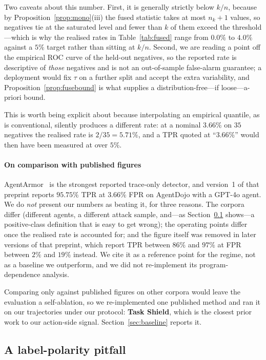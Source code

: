 \documentclass[preprint,12pt,number]{elsarticle}
\theoremstyle{definition}
\begin{document}
Two caveats about this number. First, it is generally strictly below $k/n$, because
by Proposition~\ref{prop:mono}(iii) the fused statistic takes at most $n_k+1$
values, so negatives tie at the saturated level and fewer than $k$ of them exceed
the threshold---which is why the realised rates in Table~\ref{tab:fused} range from
$0.0\%$ to $4.0\%$ against a $5\%$ target rather than sitting at $k/n$. Second, we
are reading a point off the empirical ROC curve of the held-out negatives, so the
reported rate is descriptive of \emph{those} negatives and is not an out-of-sample
false-alarm guarantee; a deployment would fix $\tau$ on a further split and accept
the extra variability, and Proposition~\ref{prop:fusebound} is what supplies a
distribution-free---if loose---a-priori bound.

This is worth being explicit about because interpolating an empirical quantile, as
is conventional, silently produces a different rate: at a nominal $3.66\%$ on $35$
negatives the realised rate is $2/35 = 5.71\%$, and a TPR quoted at ``$3.66\%$''
would then have been measured at over $5\%$.

\paragraph{On comparison with published figures}
AgentArmor~\citep{wang2025agentarmor} is the strongest reported trace-only
detector, and version~1 of that preprint reports $95.75\%$ TPR at $3.66\%$ FPR on
AgentDojo with a GPT-4o agent. We do \emph{not} present our numbers as beating it,
for three reasons. The corpora differ (different agents, a different attack
sample, and---as Section~\ref{sec:polarity} shows---a positive-class definition
that is easy to get wrong); the operating points differ once the realised rate is
accounted for; and the figure itself was removed in later versions of that
preprint, which report TPR between $86\%$ and $97\%$ at FPR between $2\%$ and
$19\%$ instead. We cite it as a reference point for the regime, not as a baseline
we outperform, and we did not re-implement its program-dependence analysis.

Comparing only against published figures on other corpora would leave the
evaluation a self-ablation, so we re-implemented one published method and ran it
on our trajectories under our protocol: \textbf{Task Shield}, which is the closest
prior work to our action-side signal. Section~\ref{sec:baseline} reports it.

\subsection{A label-polarity pitfall}\label{sec:polarity}
\end{document}
